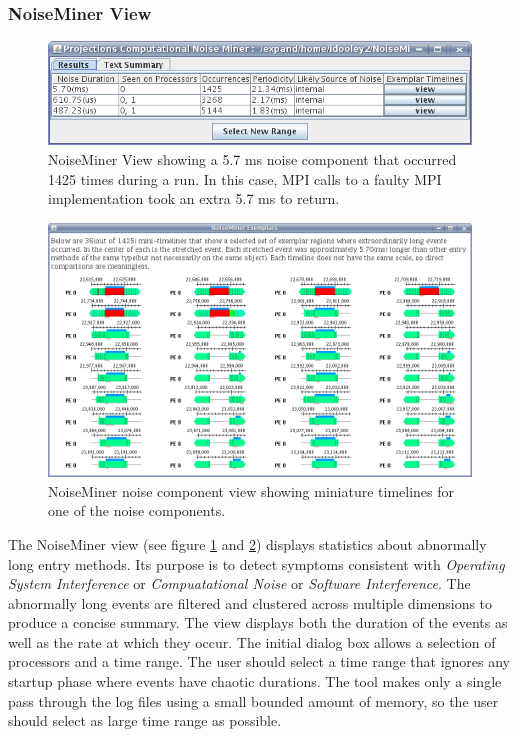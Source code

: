 
\subsubsection{NoiseMiner View}

\begin{figure}[!h]
\center
\includegraphics[width=6.0in]{fig/NoiseMiner1}
\caption{NoiseMiner View showing a 5.7 ms noise component that
occurred 1425 times during a run. In this case, MPI calls to a faulty
MPI implementation took an extra 5.7 ms to return. \label{noiseminer1}
}
\end{figure}

\begin{figure}[!h]
\center
\includegraphics[width=6.0in]{fig/NoiseMiner2}
\caption{NoiseMiner noise component view showing miniature timelines for 
one of the noise components.\label{noiseminer2} }
\end{figure}

The NoiseMiner view (see figure \ref{noiseminer1} and
\ref{noiseminer2}) displays statistics about abnormally long entry
methods. Its purpose is to detect symptoms consistent with
\textit{Operating System Interference} or \textit{Compuatational
Noise} or \textit{Software Interference}. The abnormally long events
are filtered and clustered across multiple dimensions to produce a
concise summary. The view displays both the duration of the events as
well as the rate at which they occur. The initial dialog box allows a
selection of processors and a time range. The user should select a
time range that ignores any startup phase where events have chaotic
durations. The tool makes only a single pass through the log files
using a small bounded amount of memory, so the user should select as
large time range as possible.
 
